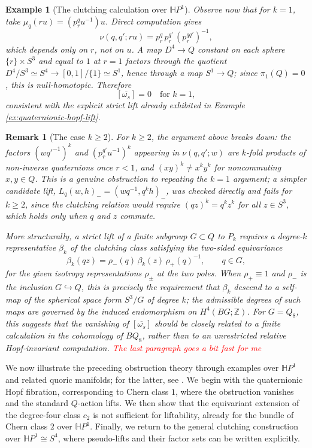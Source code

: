 \documentclass[11pt,a4paper]{article}
\numberwithin{equation}{section}
\newtheorem{remark}[definition]{Remark}
\newtheorem{example}[definition]{Example}
\theoremstyle{named}
\begin{document}
\begin{example}[The clutching calculation over $\mathbb{H}P^1$]
Observe now that for $k=1$, take $\mu_q(ru) = (p^q_r u^{-1})u$. Direct computation gives
\[
\nu(q,q';ru) = p^q_r\, p^{q'}_r\, (p^{qq'}_r)^{-1},
\]
which depends only on $r$, not on $u$. A map $D^4 \to Q$ constant on each sphere $\{r\} \times S^3$ and equal to $1$ at $r=1$ factors through the quotient $D^4/S^3 \simeq S^4 \to [0,1]/\{1\} \simeq S^1$, hence through a map $S^1 \to Q$; since $\pi_1(Q) = 0$, this is null-homotopic. Therefore
\[
[\overline{\omega_s}] = 0 \quad \text{for } k=1,
\]
consistent with the explicit strict lift already exhibited in Example
\ref{ex:quaternionic-hopf-lift}.
\end{example}

\begin{remark}[The case $k \geq 2$]
\label{rem:clutching-k2}
For $k \geq 2$, the argument above breaks down: the factors $(wq'^{-1})^k$ and $(p^{q'}_r u^{-1})^k$ appearing in $\nu(q,q';w)$ are $k$-fold products of non-inverse quaternions once $r < 1$, and $(xy)^k \neq x^k y^k$ for noncommuting $x,y \in Q$. This is a genuine obstruction to repeating the $k=1$ argument; a simpler candidate lift, $L_q(w,h)_- = (wq^{-1}, q^k h)_-$, was checked directly and fails for $k \geq 2$, since the clutching relation would require $(qz)^k = q^k z^k$ for all $z \in S^3$, which holds only when $q$ and $z$ commute.

More structurally, a strict lift of a finite subgroup $G \subset Q$ to $P_k$ requires a degree-$k$ representative $\beta_k$ of the clutching class satisfying the two-sided equivariance
\[
\beta_k(qz) = \rho_-(q)\,\beta_k(z)\,\rho_+(q)^{-1}, \qquad q \in G,
\]
for the given isotropy representations $\rho_\pm$ at the two poles. When $\rho_+ \equiv 1$ and $\rho_-$ is the inclusion $G \hookrightarrow Q$, this is precisely the requirement that $\beta_k$ descend to a self-map of the spherical space form $S^3/G$ of degree $k$; the admissible degrees of such maps are governed by the induced endomorphism on $H^4(BG;\mathbb{Z})$. For \(G=Q_8\), this suggests that the vanishing of \([\overline{\omega_s}]\) should be closely related to a finite calculation in the cohomology of \(BQ_8\), rather than to an unrestricted relative Hopf-invariant computation. \textcolor{red}{The last paragraph goes a bit fast for me}
\end{remark}

\fi

We now illustrate the preceding obstruction theory through examples over \(\mathbb H P^1\) and related quoric manifolds; for the latter, see \cite{ho}. We begin with the quaternionic Hopf fibration, corresponding to Chern class \(1\), where the obstruction vanishes and the standard \(Q\)-action lifts. We then show that the equivariant extension of the degree-four class \(c_2\) is not sufficient for liftability, already for the bundle of Chern class \(2\) over \(\mathbb H P^1\). Finally, we return to the general clutching construction over \(\mathbb H P^1\cong S^4\), where pseudo-lifts and their factor sets can be written explicitly.
\end{document}
